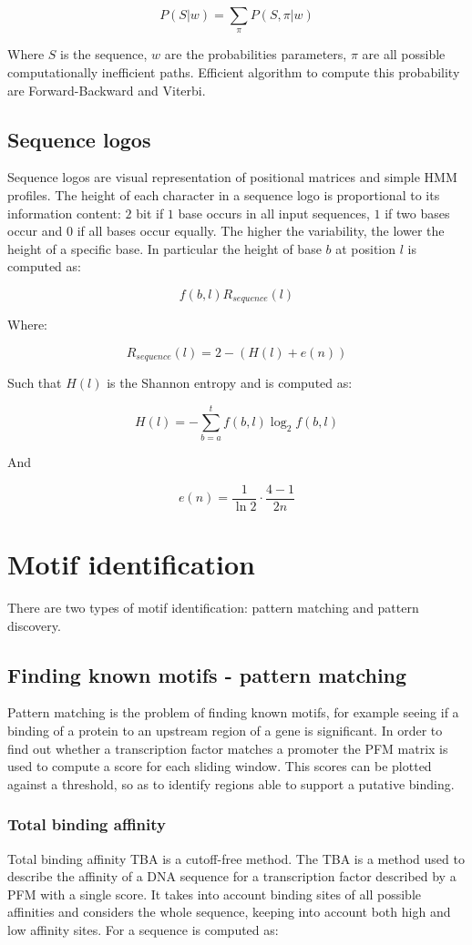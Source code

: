 		$$P(S|w) = \sum\limits_\pi P(S, \pi |w)$$

		Where $S$ is the sequence, $w$ are the probabilities parameters, $\pi$ are all possible computationally inefficient paths.
		Efficient algorithm to compute this probability are Forward-Backward and Viterbi.

	\subsection{Sequence logos}
	Sequence logos are visual representation of positional matrices and simple HMM profiles.
	The height of each character in a sequence logo is proportional to its information content: $2$ bit if $1$ base occurs in all input sequences, $1$ if two bases occur and $0$ if all bases occur equally.
	The higher the variability, the lower the height of a specific base.
	In particular the height of base $b$ at position $l$ is computed as:

	$$f(b,l)R_{sequence}(l)$$

	Where:

	$$R_{sequence}(l) = 2-(H(l) + e(n))$$

	Such that $H(l)$ is the Shannon entropy and is computed as:

	$$H(l) = -\sum\limits_{b=a}^tf(b,l)\log_2 f(b,l)$$

	And

	$$e(n) = \frac{1}{\ln 2}\cdot \frac{4-1}{2n}$$

\section{Motif identification}
There are two types of motif identification: pattern matching and pattern discovery.

	\subsection{Finding known motifs - pattern matching}
	Pattern matching is the problem of finding known motifs, for example seeing if a binding of a protein to an upstream region of a gene is significant.
	In order to find out whether a transcription factor matches a promoter the PFM matrix is used to compute a score for each sliding window.
	This scores can be plotted against a threshold, so as to identify regions able to support a putative binding.

		\subsubsection{Total binding affinity}
		Total binding affinity TBA is a cutoff-free method.
		The TBA is a method used to describe the affinity of a DNA sequence for a transcription factor described by a PFM with a single score.
		It takes into account binding sites of all possible affinities and considers the whole sequence, keeping into account both high and low affinity sites.
		For a sequence is computed as:

